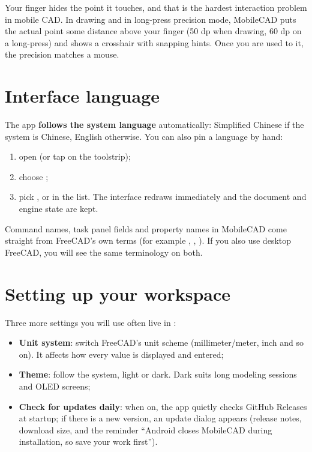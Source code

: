 \begin{tip}
Your finger hides the point it touches, and that is the hardest interaction problem in mobile CAD. In drawing
and in long-press precision mode, MobileCAD puts the actual point some distance above your finger (50 dp when
drawing, 60 dp on a long-press) and shows a crosshair with snapping hints. Once you are used to it, the
precision matches a mouse.
\end{tip}

\section{Interface language}

The app \textbf{follows the system language} automatically: Simplified Chinese if the system is Chinese,
English otherwise. You can also pin a language by hand:

\begin{enumerate}
  \item open  (or tap  on the toolstrip);
  \item choose ;
  \item pick ,  or  in the list. The interface
        redraws immediately and the document and engine state are kept.
\end{enumerate}


\begin{tip}
Command names, task panel fields and property names in MobileCAD come straight from FreeCAD's own terms (for
example , , ). If you also use desktop FreeCAD, you will see the same
terminology on both.
\end{tip}

\section{Setting up your workspace}

Three more settings you will use often live in :

\begin{itemize}
  \item \textbf{Unit system}: switch FreeCAD's unit scheme (millimeter/meter, inch and so on). It affects how
        every value is displayed and entered;
  \item \textbf{Theme}: follow the system, light or dark. Dark suits long modeling sessions and OLED screens;
  \item \textbf{Check for updates daily}: when on, the app quietly checks GitHub Releases at startup; if there
        is a new version, an update dialog appears (release notes, download size, and the reminder “Android
        closes MobileCAD during installation, so save your work first”).
\end{itemize}

